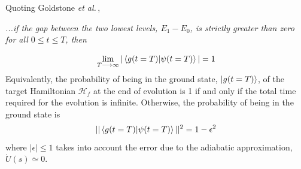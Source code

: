 \newpage
Quoting Goldstone \textit{et al.}\,\cite{Farhi2000QuantumEvolution},
\begin{displayquote}
\textit{...if the gap between the two lowest levels, $E_{1} - E_{0}$, is strictly greater than zero for all $0 \leq t \leq T$, then}
\end{displayquote}
\begin{equation}
    \lim_{T\longrightarrow \infty} | \braket{g(t=T) | \psi(t=T)}| = 1
\end{equation}
Equivalently, the probability of being in the ground state, $\ket{g(t=T)}$, of the target Hamiltonian $\mathcal{H}_{f}$ at the end of evolution is 1 if and only if the total time required for the evolution is infinite. Otherwise, the probability of being in the ground state is
\begin{equation}
    || \braket{g(t=T) | \psi(t=T)}||^{2} = 1 - \epsilon^{2}
\end{equation}
where $|\epsilon| \leq 1$ takes into account the error due to the adiabatic approximation, $\dot{U}(s) \simeq 0$.
